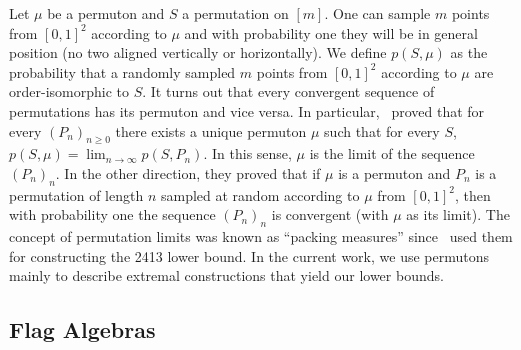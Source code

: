 Let $\mu$ be a permuton and $S$ a permutation on $[m]$. One can sample $m$ points from $[0,1]^2$ according to $\mu$ and with probability one they will be in general position (no two aligned vertically or horizontally). We define $p(S,\mu)$ as the probability that a randomly sampled $m$ points from $[0,1]^2$ according to $\mu$ are order-isomorphic to $S$. It turns out that every convergent sequence of permutations has its permuton and vice versa. In particular,~\cite{hoppen2013permlimits} proved that for every $(P_n)_{n\geq 0}$ there exists a unique permuton $\mu$ such that for every $S$, $p(S,\mu) = \lim_{n\to\infty}p(S,P_n)$. In this sense, $\mu$ is the limit of the sequence $(P_n)_n$. In the other direction, they proved that if $\mu$ is a permuton and $P_n$ is a permutation of length $n$ sampled at random according to $\mu$ from $[0,1]^2$, then with probability one the sequence $(P_n)_n$ is convergent (with $\mu$ as its limit). The concept of permutation limits was known as ``packing measures'' since~\cite{presutti2010packing} used them for constructing the 2413 lower bound. In the current work, we use permutons mainly to describe extremal constructions that yield our lower bounds. 


\subsection{Flag Algebras}
\label{sec:FA}

